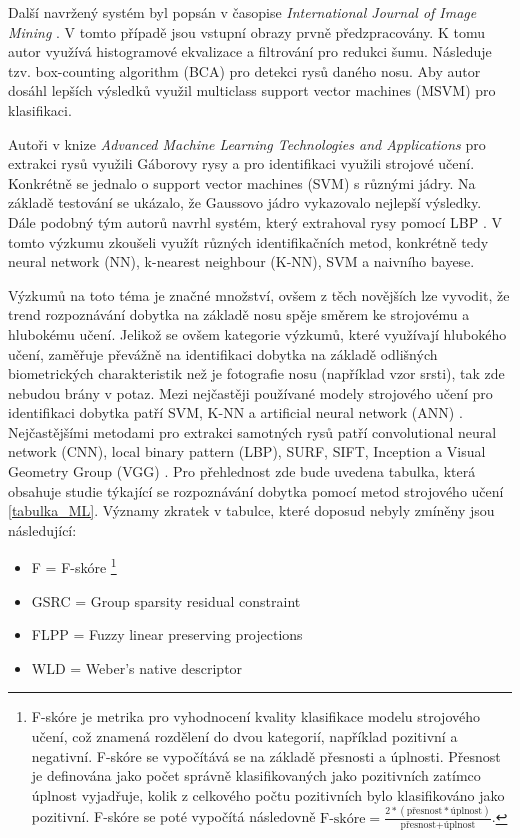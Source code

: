 Další navržený systém byl popsán v časopise \textit{International Journal of Image Mining} \cite{doi:10.1504/IJIM.2015.070022}. V tomto případě jsou vstupní obrazy prvně předzpracovány. K tomu autor využívá histogramové ekvalizace a filtrování pro redukci šumu. Následuje tzv. box-counting algorithm (BCA) pro detekci rysů daného nosu. Aby autor dosáhl lepších výsledků využil multiclass support vector machines (MSVM) pro klasifikaci. 

Autoři v knize \textit{Advanced Machine Learning Technologies and Applications} \cite{10.1007/978-3-319-13461-1_23} pro extrakci rysů využili Gáborovy rysy a pro identifikaci využili strojové učení. Konkrétně se jednalo o support vector machines (SVM) s různými jádry. Na základě testování se ukázalo, že Gaussovo jádro vykazovalo nejlepší výsledky. Dále podobný tým autorů navrhl systém, který extrahoval rysy pomocí LBP \cite{10.1007/978-3-319-08156-4_22}. V tomto výzkumu zkoušeli využít různých identifikačních metod, konkrétně tedy neural network (NN), k-nearest neighbour (K-NN), SVM a naivního bayese. 

Výzkumů na toto téma je značné množství, ovšem z těch novějších lze vyvodit, že trend rozpoznávání dobytka na základě nosu spěje směrem ke strojovému a hlubokému učení. Jelikož se ovšem kategorie výzkumů, které využívají hlubokého učení, zaměřuje převážně na identifikaci dobytka na základě odlišných biometrických charakteristik než je fotografie nosu (například vzor srsti), tak zde nebudou brány v potaz. Mezi nejčastěji používané modely strojového učení pro identifikaci dobytka patří SVM, K-NN a artificial neural network (ANN) \cite{HOSSAIN2022138}. Nejčastějšími metodami pro extrakci samotných rysů patří convolutional neural network (CNN), local binary pattern (LBP), SURF, SIFT, Inception a Visual Geometry Group (VGG) \cite{HOSSAIN2022138}. Pro přehlednost zde bude uvedena tabulka, která obsahuje studie týkající se rozpoznávání dobytka pomocí metod strojového učení \ref{tabulka_ML}. Významy zkratek v tabulce, které doposud nebyly zmíněny jsou následující:

\newpage
\begin{itemize}
        \item F = F-skóre \footnote{F-skóre je metrika pro vyhodnocení kvality klasifikace modelu strojového učení, což znamená rozdělení do dvou kategorií, například pozitivní a negativní. F-skóre se vypočítává se na základě přesnosti a úplnosti. Přesnost je definována jako počet správně klasifikovaných jako pozitivních zatímco úplnost vyjadřuje, kolik z celkového počtu pozitivních bylo klasifikováno jako pozitivní. F-skóre se poté vypočítá následovně $ \text{F-skóre} = \frac{2 * (\text{přesnost} * \text{úplnost})}{\text{přesnost} + \text{úplnost}} $.}
        \item GSRC = Group sparsity residual constraint
        \item FLPP = Fuzzy linear preserving projections
        \item WLD = Weber’s native descriptor
\end{itemize}


